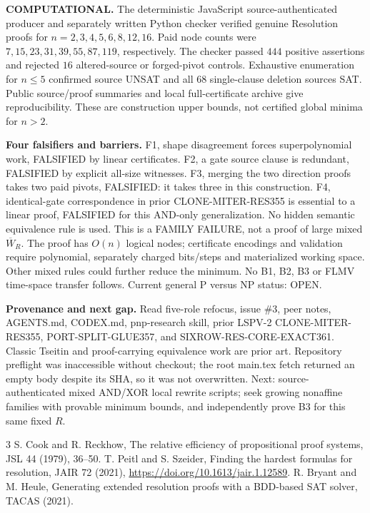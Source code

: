 \documentclass[11pt]{article}
\begin{document}
\noindent\textbf{COMPUTATIONAL.}
The deterministic JavaScript source-authenticated producer and separately written Python checker verified genuine Resolution proofs for $n=2,3,4,5,6,8,12,16$. Paid node counts were $7,15,23,31,39,55,87,119$, respectively. The checker passed $444$ positive assertions and rejected $16$ altered-source or forged-pivot controls. Exhaustive enumeration for $n\le5$ confirmed source UNSAT and all 68 single-clause deletion sources SAT. Public source/proof summaries and local full-certificate archive give reproducibility. These are construction upper bounds, not certified global minima for $n>2$.

\noindent\textbf{Four falsifiers and barriers.}
F1, shape disagreement forces superpolynomial work, FALSIFIED by linear certificates. F2, a gate source clause is redundant, FALSIFIED by explicit all-size witnesses. F3, merging the two direction proofs takes two paid pivots, FALSIFIED: it takes three in this construction. F4, identical-gate correspondence in prior CLONE-MITER-RES355 is essential to a linear proof, FALSIFIED for this AND-only generalization. No hidden semantic equivalence rule is used. This is a FAMILY FAILURE, not a proof of large mixed $\overline W_R$. The proof has $O(n)$ logical nodes; certificate encodings and validation require polynomial, separately charged bits/steps and materialized working space. Other mixed rules could further reduce the minimum. No B1, B2, B3 or FLMV time-space transfer follows. Current general P versus NP status: OPEN.

\noindent\textbf{Provenance and next gap.}
Read five-role refocus, issue \#3, peer notes, AGENTS.md, CODEX.md, pnp-research skill, prior LSPV-2 CLONE-MITER-RES355, PORT-SPLIT-GLUE357, and SIXROW-RES-CORE-EXACT361. Classic Tseitin and proof-carrying equivalence work are prior art. Repository preflight was inaccessible without checkout; the root main.tex fetch returned an empty body despite its SHA, so it was not overwritten. Next: source-authenticated mixed AND/XOR local rewrite scripts; seek growing nonaffine families with provable minimum bounds, and independently prove B3 for this same fixed $R$.
\begin{thebibliography}{3}
 S. Cook and R. Reckhow, The relative efficiency of propositional proof systems, JSL 44 (1979), 36--50.
 T. Peitl and S. Szeider, Finding the hardest formulas for resolution, JAIR 72 (2021), \url{https://doi.org/10.1613/jair.1.12589}.
 R. Bryant and M. Heule, Generating extended resolution proofs with a BDD-based SAT solver, TACAS (2021).
\end{thebibliography}
\end{document}
